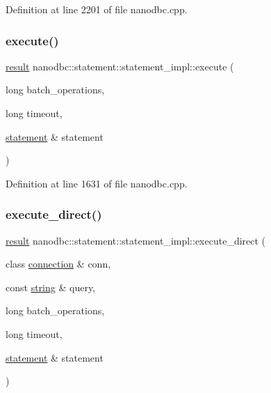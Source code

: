 Definition at line 2201 of file nanodbc.\+cpp.

\mbox{\label{classnanodbc_1_1statement_1_1statement__impl_ac0a71bdfc730c230ed63844063617297}} 
\subsubsection{\texorpdfstring{execute()}{execute()}}
{\footnotesize\ttfamily \mbox{\hyperlink{classnanodbc_1_1result}{result}} nanodbc\+::statement\+::statement\+\_\+impl\+::execute (\begin{DoxyParamCaption}\item[{long}]{batch\+\_\+operations,  }\item[{long}]{timeout,  }\item[{\mbox{\hyperlink{classnanodbc_1_1statement}{statement}} \&}]{statement }\end{DoxyParamCaption})\hspace{0.3cm}{\ttfamily [inline]}}



Definition at line 1631 of file nanodbc.\+cpp.

\mbox{\label{classnanodbc_1_1statement_1_1statement__impl_a816b21e8b052e450e0f93f0425c58cda}} 
\subsubsection{\texorpdfstring{execute\_direct()}{execute\_direct()}}
{\footnotesize\ttfamily \mbox{\hyperlink{classnanodbc_1_1result}{result}} nanodbc\+::statement\+::statement\+\_\+impl\+::execute\+\_\+direct (\begin{DoxyParamCaption}\item[{class \mbox{\hyperlink{classnanodbc_1_1connection}{connection}} \&}]{conn,  }\item[{const \mbox{\hyperlink{namespacenanodbc_abfc0ece56278e590911ec8352774c212}{string}} \&}]{query,  }\item[{long}]{batch\+\_\+operations,  }\item[{long}]{timeout,  }\item[{\mbox{\hyperlink{classnanodbc_1_1statement}{statement}} \&}]{statement }\end{DoxyParamCaption})\hspace{0.3cm}{\ttfamily [inline]}}



